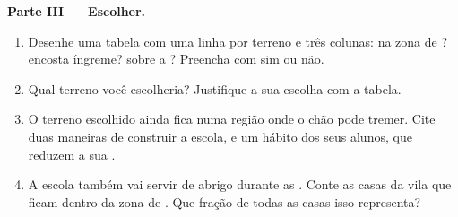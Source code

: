 \begin{problem}
\noindent\textbf{Parte III --- Escolher.}\par\nopagebreak
\begin{enumerate}[resume, beginpenalty=10000]
  \item Desenhe uma tabela com uma linha por terreno e três colunas: na
        zona de ? encosta íngreme? sobre a ? Preencha com
        sim ou não.
  \item Qual terreno você escolheria? Justifique a sua escolha com a
        tabela.
  \item O terreno escolhido ainda fica numa região onde o chão pode
        tremer. Cite duas maneiras de construir a escola, e um hábito dos
        seus alunos, que reduzem a sua .
  \item A escola também vai servir de abrigo durante as . Conte
        as casas da vila que ficam dentro da zona de . Que fração
        de todas as casas isso representa?
\end{enumerate}
\end{problem}
